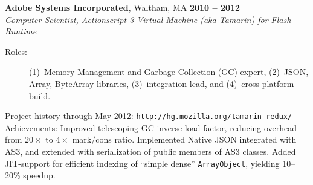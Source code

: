 \documentclass[margin,line,draft]{res}
\def\noneed#1{}
\begin{document}
\begin{resume}
    \textbf{Adobe Systems Incorporated}, Waltham, MA \hfill \textbf{2010 -- 2012}\\\vspace{1mm}%
    \textsl{Computer Scientist, Actionscript 3 Virtual Machine (aka Tamarin) for Flash Runtime}
\begin{description}
\item[\rm Roles:] (1)~Memory Management and Garbage Collection (GC) expert,
  (2)~JSON, Array, ByteArray libraries,
  (3)~integration lead,
  and
  (4)~cross-platform build.
\end{description}
    \vspace{-2mm}
    Project history through May 2012: {\tt http://hg.mozilla.org/tamarin-redux/}\\
    Achievements: Improved telescoping GC inverse load-factor, reducing overhead from $20\times$ to $4\times$ mark/cons ratio. Implemented Native JSON integrated with AS3, and extended with serialization of public members of AS3 classes. Added JIT-support for efficient indexing of ``simple dense'' {\tt ArrayObject}, yielding 10--20\% speedup.
% 
% 
% 
% 

\end{resume}
\end{document}

